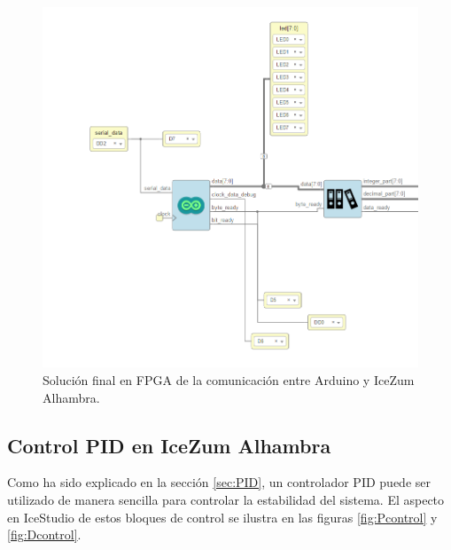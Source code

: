 \begin{figure}[H]
	\center
	\includegraphics[scale=0.6]{imagenes/Balancing_robot/arduino_arrange.PNG}
	\caption{Solución final en FPGA de la comunicación entre Arduino y IceZum Alhambra.}
	\label{fig:arduino_arrange}
\end{figure}




\subsection{Control PID en IceZum Alhambra}
Como ha sido explicado en la sección \ref{sec:PID}, un controlador PID puede ser utilizado de manera sencilla para controlar la estabilidad del sistema. \newline
El aspecto en IceStudio de estos bloques de control se ilustra en las figuras \ref{fig:Pcontrol} y \ref{fig:Dcontrol}.

